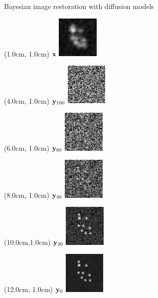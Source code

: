 \documentclass{beamer}					%
\begin{document}
\begin{frame}{Bayesian image restoration with diffusion models}

\begin{textblock*}{2cm}(1.0cm, 1.0cm)
$\bold{x}$
\includegraphics[width=2cm]{media/diffusion_example/Diffusion_lr-0.png}
\end{textblock*}
\begin{textblock*}{2cm}(4.0cm, 1.0cm)
$\bold{y}_{100}$
\includegraphics[width=2cm]{media/diffusion_example/0_1_sr_1.png}
\end{textblock*}
\begin{textblock*}{2cm}(6.0cm, 1.0cm)
$\bold{y}_{80}$
\includegraphics[width=2cm]{media/diffusion_example/0_1_sr_19.png}
\end{textblock*}
\begin{textblock*}{2cm}(8.0cm, 1.0cm)
$\bold{y}_{40}$
\includegraphics[width=2cm]{media/diffusion_example/0_1_sr_39.png}
\end{textblock*}
\begin{textblock*}{2cm}(10.0cm,1.0cm)
$\bold{y}_{20}$
\includegraphics[width=2cm]{media/diffusion_example/0_1_sr_79.png}
\end{textblock*}
\begin{textblock*}{2cm}(12.0cm, 1.0cm)
$\bold{y}_{0}$
\includegraphics[width=2cm]{media/diffusion_example/0_1_sr_99.png}
\end{textblock*}


\end{frame}
\end{document}
